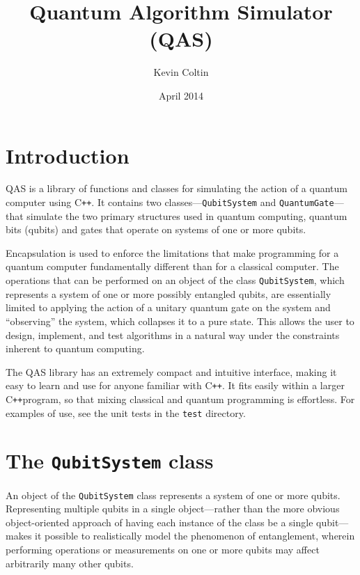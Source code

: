 \documentclass{article}
\title{Quantum Algorithm Simulator (QAS)}
\author{Kevin Coltin}
\date{April 2014}
\newcommand{\cpp}{C{}\verb~++~}
\begin{document}
 

\maketitle 

\tableofcontents

\section{Introduction} 

QAS is a library of functions and classes for simulating the action of a quantum computer using \cpp. It contains two classes---\verb~QubitSystem~ and \verb~QuantumGate~---that simulate the two primary structures used in quantum computing, quantum bits (qubits) and gates that operate on systems of one or more qubits. 

Encapsulation is used to enforce the limitations that make programming for a quantum computer fundamentally different than for a classical computer. The operations that can be performed on an object of the class \verb~QubitSystem~, which represents a system of one or more possibly entangled qubits, are essentially limited to applying the action of a unitary quantum gate on the system and ``observing'' the system, which collapses it to a pure state. This allows the user to design, implement, and test algorithms in a natural way under the constraints inherent to quantum computing. 

The QAS library has an extremely compact and intuitive interface, making it easy to learn and use for anyone familiar with \cpp. It fits easily within a larger \cpp program, so that mixing classical and quantum programming is effortless. For examples of use, see the unit tests in the \verb~test~ directory. 


\section{The \texttt{QubitSystem} class}

An object of the \verb~QubitSystem~ class represents a system of one or more qubits. Representing multiple qubits in a single object---rather than the more obvious object-oriented approach of having each instance of the class be a single qubit---makes it possible to realistically model the phenomenon of entanglement, wherein performing operations or measurements on one or more qubits may affect arbitrarily many other qubits. 
\end{document}

